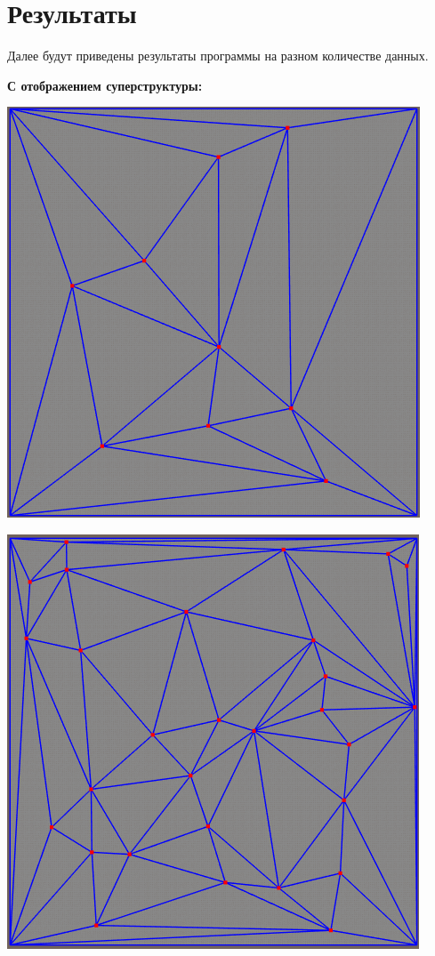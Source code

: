 \documentclass[a4paper, 12pt]{article}   	%
\begin{document}
\section{Результаты}
    Далее будут приведены результаты программы на разном количестве данных. 
    
    \textbf{С отображением суперструктуры:}
    \begin{center}
        \begin{minipage}{0.47\linewidth}
            \includegraphics[width=\linewidth]{img/triang_super_9}
        \end{minipage}
        \begin{minipage}{0.47\linewidth}
            \includegraphics[width=\linewidth]{img/triang_super_29}

\end{minipage}
\end{center}
\end{document}
